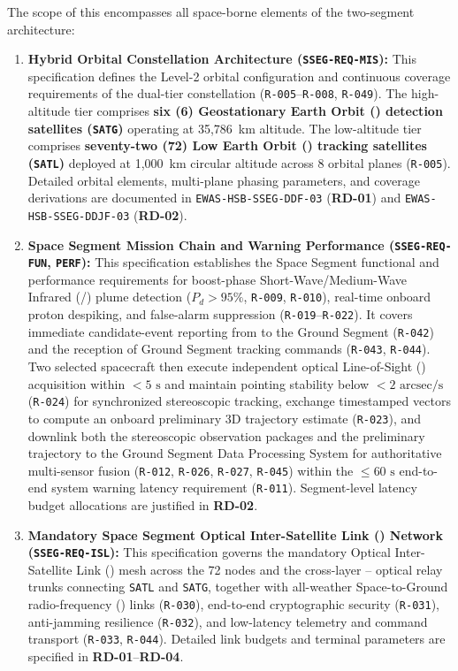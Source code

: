The scope of this  encompasses all space-borne elements of the two-segment  architecture:
\begin{enumerate}
    \item \textbf{Hybrid Orbital Constellation Architecture (\texttt{SSEG-REQ-MIS}):} This specification defines the Level-2 orbital configuration and continuous coverage requirements of the dual-tier constellation (\texttt{R-005}--\texttt{R-008}, \texttt{R-049}). The high-altitude tier comprises \textbf{six (6) Geostationary Earth Orbit () detection satellites (\texttt{SATG})} operating at 35,786~km altitude. The low-altitude tier comprises \textbf{seventy-two (72) Low Earth Orbit () tracking satellites (\texttt{SATL})} deployed at 1,000~km circular altitude across 8 orbital planes (\texttt{R-005}). Detailed orbital elements, multi-plane phasing parameters, and coverage derivations are documented in \texttt{EWAS-HSB-SSEG-DDF-03} (\textbf{RD-01}) and \texttt{EWAS-HSB-SSEG-DDJF-03} (\textbf{RD-02}).
    \item \textbf{Space Segment Mission Chain and Warning Performance (\texttt{SSEG-REQ-FUN}, \texttt{PERF}):} This specification establishes the Space Segment functional and performance requirements for boost-phase Short-Wave/Medium-Wave Infrared (/) plume detection ($P_d > 95\%$, \texttt{R-009}, \texttt{R-010}), real-time onboard proton despiking, and false-alarm suppression (\texttt{R-019}--\texttt{R-022}). It covers immediate candidate-event reporting from  to the Ground Segment (\texttt{R-042}) and the reception of Ground Segment tracking commands (\texttt{R-043}, \texttt{R-044}). Two selected  spacecraft then execute independent optical Line-of-Sight () acquisition within $< 5\text{ s}$ and maintain pointing stability below $< 2\text{ arcsec/s}$ (\texttt{R-024}) for synchronized stereoscopic tracking, exchange timestamped  vectors to compute an onboard preliminary 3D trajectory estimate (\texttt{R-023}), and downlink both the stereoscopic  observation packages and the preliminary trajectory to the Ground Segment Data Processing System for authoritative multi-sensor fusion (\texttt{R-012}, \texttt{R-026}, \texttt{R-027}, \texttt{R-045}) within the $\le 60\text{ s}$ end-to-end system warning latency requirement (\texttt{R-011}). Segment-level latency budget allocations are justified in \textbf{RD-02}.
    \item \textbf{Mandatory Space Segment Optical Inter-Satellite Link () Network (\texttt{SSEG-REQ-ISL}):} This specification governs the mandatory Optical Inter-Satellite Link () mesh across the 72  nodes and the cross-layer -- optical relay trunks connecting \texttt{SATL} and \texttt{SATG}, together with all-weather Space-to-Ground radio-frequency () links (\texttt{R-030}), end-to-end cryptographic security (\texttt{R-031}), anti-jamming resilience (\texttt{R-032}), and low-latency telemetry and command transport (\texttt{R-033}, \texttt{R-044}). Detailed link budgets and terminal parameters are specified in \textbf{RD-01}--\textbf{RD-04}.

\end{enumerate}

